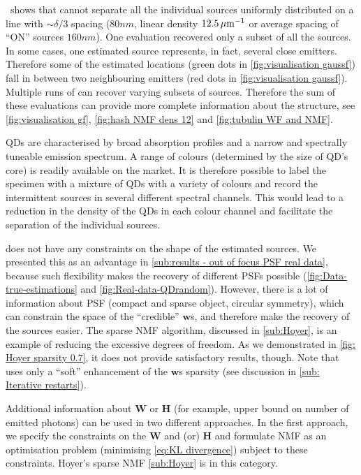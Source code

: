\ccc\ shows that \inmf{} cannot separate all the individual sources uniformly distributed on a line with $\sim \delta/3$ spacing ($80 \unit{nm}$, linear density $12.5 \, \mathrm{\mu m}^{-1}$ or average spacing of ``ON'' sources $160 \unit{nm}$). One \inmf{} evaluation recovered only a subset of all the sources. In some cases, one \inmf{} estimated source represents, in fact, several close emitters. Therefore some of the estimated locations (green dots in \autoref{fig:visualisation gaussf}\bbb) fall in between two neighbouring emitters (red dots in \autoref{fig:visualisation gaussf}\bbb). Multiple runs of \inmf{} can recover varying subsets of sources. 
Therefore the sum of these evaluations can provide more complete information about the structure, see \autoref{fig:visualisation gf}, \ref{fig:hash NMF dens 12} and \ref{fig:tubulin WF and NMF}. 


QDs are characterised by broad absorption profiles and a narrow and spectrally tuneable emission spectrum. A range of colours (determined by the size of QD's core) is readily available on the market. It is therefore possible to label the specimen with a mixture of QDs with a variety of colours and record the intermittent sources in several different spectral channels. This would lead to a reduction in the density of the QDs in each colour channel and facilitate the separation of the individual sources. 

\inmf{} does not have any constraints on the shape of the estimated sources. We presented this as an advantage in \autoref{sub:results - out of focus PSF real data}, because such flexibility makes the recovery of different PSFs possible (\autoref{fig:Data-true-estimations} and \ref{fig:Real-data-QDrandom}\bbb). However, there is a lot of information about PSF (compact and sparse object, circular symmetry), which can constrain the space of the ``credible'' $\bm{w}$s, and therefore make the recovery of the sources easier. The sparse NMF algorithm, discussed in \autoref{sub:Hoyer}, is an example of reducing the excessive degrees of freedom. As we demonstrated in \autoref{fig: Hoyer sparsity 0.7}, it does not provide satisfactory results, though. Note that \inmf{} uses only a ``soft'' enhancement of the $\bm{w}$s sparsity  (see discussion in \autoref{sub: Iterative restarts}). 

Additional information about $\bm{W}$ or $\bm{H}$ (for example, upper bound on number of emitted photons) can be used in two different approaches. In the first approach, we specify the constraints on the $\bm{W}$ and (or) $\bm{H}$ and formulate NMF as an optimisation problem (minimising \autoref{eq:KL divergence}) subject to these constraints. Hoyer's sparse NMF \autoref{sub:Hoyer} is in this category. 

